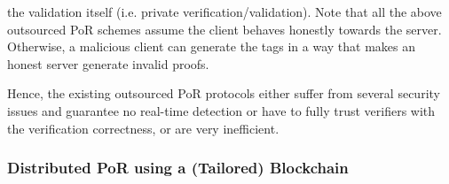 the validation itself (i.e. private verification/validation).  Note that   all the above outsourced PoR schemes \cite{armknecht2014outsourced,xu2016lightweight,Storage-Time}  assume the client behaves honestly towards the server. Otherwise, a malicious client can generate the tags in a way that  makes an honest server generate invalid proofs. 







Hence, the existing outsourced PoR protocols either suffer from several security issues and guarantee no real-time detection or have to fully trust verifiers with the verification correctness, or are very inefficient. 


 \subsubsection{Distributed PoR using a (Tailored) Blockchain}
 
